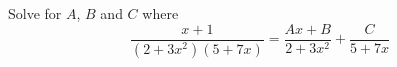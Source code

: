 Solve for $A$, $B$ and $C$ where
\[
\frac{x+1}{(2 + 3x^2)(5 + 7x)} 
= 
\frac{Ax + B}{2 + 3x^2} + \frac{C}{5 + 7x}
\]
